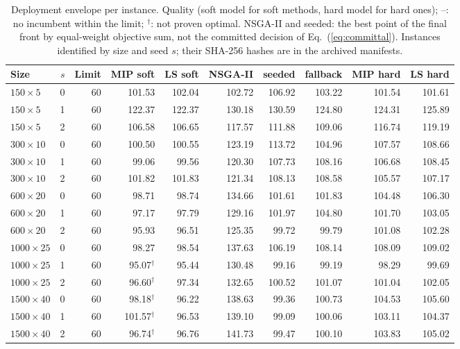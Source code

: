 \begin{table}[H]
\centering
\caption{Deployment envelope per instance. Quality (soft model for soft methods, hard model for hard ones); --: no incumbent within the limit; $^\dagger$: not proven optimal. NSGA-II and seeded: the best point of the final front by equal-weight objective sum, not the committed decision of Eq.~(\ref{eq:committal}). Instances identified by size and seed $s$; their SHA-256 hashes are in the archived manifests.\label{tab:envelope-instances}}
\scriptsize
\setlength{\tabcolsep}{3pt}
\begin{tabular}{lrrrrrrrrr}
\toprule
Size & $s$ & Limit & MIP soft & LS soft & NSGA-II & seeded & fallback & MIP hard & LS hard\\
\midrule
$150\times5$ & 0 & 60 & 101.53 & 102.04 & 102.72 & 106.92 & 103.22 & 101.54 & 101.61\\
$150\times5$ & 1 & 60 & 122.37 & 122.37 & 130.18 & 130.59 & 124.80 & 124.31 & 125.89\\
$150\times5$ & 2 & 60 & 106.58 & 106.65 & 117.57 & 111.88 & 109.06 & 116.74 & 119.19\\
$300\times10$ & 0 & 60 & 100.50 & 100.55 & 123.19 & 113.72 & 104.96 & 107.57 & 108.66\\
$300\times10$ & 1 & 60 & 99.06 & 99.56 & 120.30 & 107.73 & 108.16 & 106.68 & 108.45\\
$300\times10$ & 2 & 60 & 101.82 & 101.83 & 121.34 & 108.13 & 108.58 & 105.57 & 107.17\\
$600\times20$ & 0 & 60 & 98.71 & 98.74 & 134.66 & 101.61 & 101.83 & 104.48 & 106.30\\
$600\times20$ & 1 & 60 & 97.17 & 97.79 & 129.16 & 101.97 & 104.80 & 101.70 & 103.05\\
$600\times20$ & 2 & 60 & 95.93 & 96.51 & 125.35 & 99.72 & 99.79 & 101.08 & 102.28\\
$1000\times25$ & 0 & 60 & 98.27 & 98.54 & 137.63 & 106.19 & 108.14 & 108.09 & 109.02\\
$1000\times25$ & 1 & 60 & 95.07$^\dagger$ & 95.44 & 130.48 & 99.16 & 99.19 & 98.29 & 99.69\\
$1000\times25$ & 2 & 60 & 96.60$^\dagger$ & 97.34 & 132.65 & 100.52 & 101.07 & 101.04 & 102.05\\
$1500\times40$ & 0 & 60 & 98.18$^\dagger$ & 96.22 & 138.63 & 99.36 & 100.73 & 104.53 & 105.60\\
$1500\times40$ & 1 & 60 & 101.57$^\dagger$ & 96.53 & 139.10 & 99.09 & 100.06 & 103.11 & 104.37\\
$1500\times40$ & 2 & 60 & 96.74$^\dagger$ & 96.76 & 141.73 & 99.47 & 100.10 & 103.83 & 105.02\\

\end{tabular}
\end{table}
